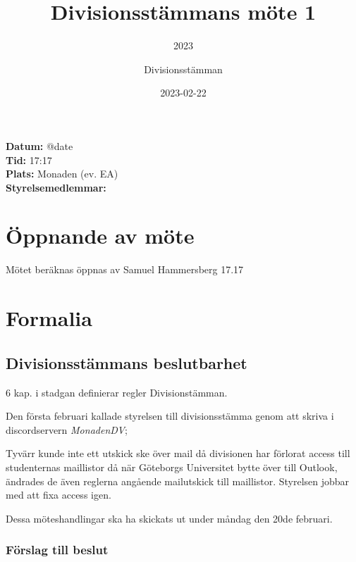 \documentclass[protokoll]{dvd}
\begin{document}
\title{Divisionsstämmans möte 1}
\subtitle{2023}
\author{Divisionsstämman}
\date{2023-02-22}

\textbf{Datum:} \csname @date\endcsname\\
\textbf{Tid:} 17:17\\
\textbf{Plats:} Monaden (ev. EA)\\
\textbf{Styrelsemedlemmar:}
\begin{närvarande_förtroendevalda}
\end{närvarande_förtroendevalda}


\section{Öppnande av möte}
Mötet beräknas öppnas av Samuel Hammersberg 17.17

\section{Formalia}

\subsection{Divisionsstämmans beslutbarhet}

6 kap. i stadgan definierar regler Divisionstämman.

Den första februari kallade styrelsen till divisionsstämma genom att skriva i discordservern \emph{MonadenDV};

Tyvärr kunde inte ett utskick ske över mail då divisionen har förlorat
access till studenternas maillistor då när Göteborgs Universitet
bytte över till Outlook, ändrades de även reglerna angående mailutskick
till maillistor. Styrelsen jobbar med att fixa access igen.

Dessa möteshandlingar ska ha skickats ut under måndag den 20de februari.

\subsubsection*{Förslag till beslut}
\end{document}
